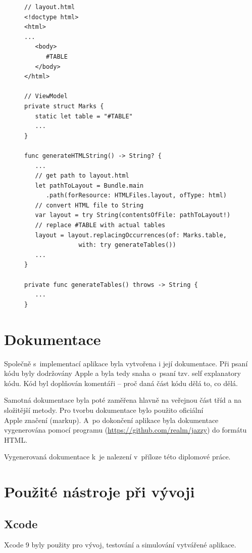 \documentclass[thesis=M,czech]{FITthesis}[2012/06/26]
\begin{document}
\begin{figure}
\begin{minipage}{\linewidth}
\begin{lstlisting}[caption={Ukázka postupného skládání HTML souboru},label={lst:PDFGen}]
// layout.html
<!doctype html>
<html>
...
   <body>
      #TABLE
   </body>
</html>

// ViewModel
private struct Marks {
   static let table = "#TABLE"
   ...
}

func generateHTMLString() -> String? {
   ...
   // get path to layout.html
   let pathToLayout = Bundle.main
      .path(forResource: HTMLFiles.layout, ofType: html)
   // convert HTML file to String
   var layout = try String(contentsOfFile: pathToLayout!)
   // replace #TABLE with actual tables
   layout = layout.replacingOccurrences(of: Marks.table, 
               with: try generateTables())
   ...
}

private func generateTables() throws -> String {
   ...
}
\end{lstlisting}
\end{minipage}
\end{figure}

\section{Dokumentace}
Společně s~implementací aplikace byla vytvořena i její dokumentace. Při psaní kódu byly dodržovány Apple  a byla tedy snaha o~psaní tzv. self explanatory kódu. Kód byl doplňován komentáři -- proč daná část kódu dělá to, co dělá. 

Samotná dokumentace byla poté zaměřena hlavně na veřejnou část tříd a na složitější metody. Pro tvorbu dokumentace bylo použito oficiální \\Apple značení (markup). A~po dokončení aplikace byla dokumentace vygenerována pomocí programu  (\url{https://github.com/realm/jazzy}) do formátu HTML.

Vygenerovaná dokumentace k~je nalezení v~příloze této diplomové práce. 

\section{Použité nástroje při vývoji}
\subsection{Xcode}
Xcode 9 byly použity pro vývoj, testování a simulování vytvářené aplikace. 
\end{document}
